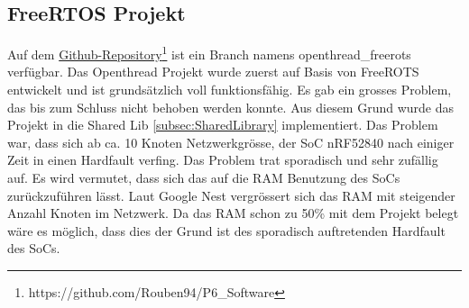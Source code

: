 \subsection{FreeRTOS Projekt}\label{susec:FreeRTOS Projek}
Auf dem \href{https://github.com/Rouben94/P6_Software}{Github-Repository\footnote{\url{https://github.com/Rouben94/P6_Software}\cite{anklin_bobst_horath_rouben94p6_software_nodate}}} ist ein Branch namens openthread\_freerots verfügbar. Das Openthread Projekt wurde zuerst auf Basis von FreeROTS entwickelt und ist grundsätzlich voll funktionsfähig. Es gab ein grosses Problem, das bis zum Schluss nicht behoben werden konnte. Aus diesem Grund wurde das Projekt in die Shared Lib \ref{subsec:SharedLibrary} implementiert. Das Problem war, dass sich ab ca. 10 Knoten Netzwerkgrösse, der SoC nRF52840 nach einiger Zeit in einen Hardfault verfing. Das Problem trat sporadisch und sehr zufällig auf. Es wird vermutet, dass sich das auf die RAM Benutzung des SoCs zurückzuführen lässt. Laut Google Nest vergrössert sich das RAM mit steigender Anzahl Knoten im Netzwerk. Da das RAM schon zu 50\% mit dem Projekt belegt wäre es möglich, dass dies der Grund ist des sporadisch auftretenden Hardfault des SoCs.